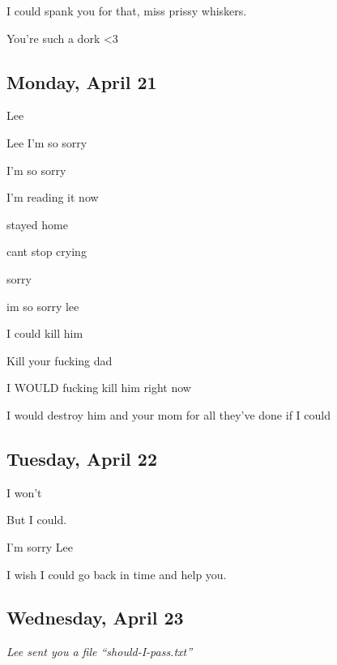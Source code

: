 { I could spank you for that, miss prissy whiskers.

 You're such a dork \textless{}3

\newpage

\subsection*{Monday, April 21}\label{monday-april-21}

 Lee

 Lee I'm so sorry

 I'm so sorry

 I'm reading it now

 stayed home

 cant stop crying

 sorry

 im so sorry lee

 I could kill him

 Kill your fucking dad

 I WOULD fucking kill him right now

 I would destroy him and your mom for all they've done if I could

\newpage

\subsection*{Tuesday, April 22}\label{tuesday-april-22}

 I won't

 But I could.

 I'm sorry Lee

 I wish I could go back in time and help you.

\newpage

\subsection*{Wednesday, April 23}\label{wednesday-april-23}

\begin{flushright}
\emph{Lee sent you a file ``should-I-pass.txt''}
\end{flushright}

}
